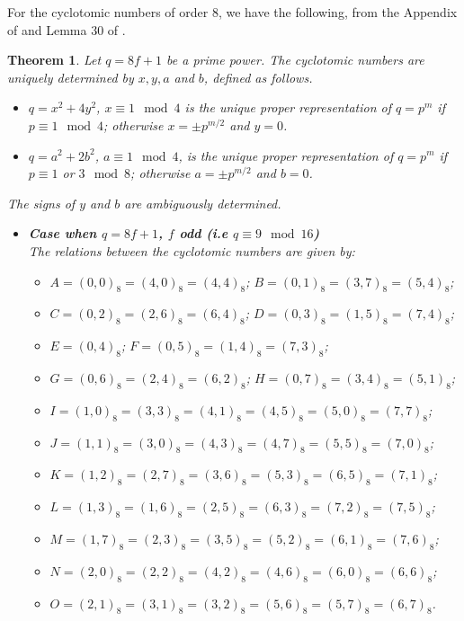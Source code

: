 \documentclass[12pt, a4paper]{article}
\newtheorem{theorem}{Theorem}[section]
\theoremstyle{definition}
\begin{document}
For the cyclotomic numbers of order $8$, we have the following, from the Appendix of \cite{BraMei} and Lemma 30 of \cite{Sto}.

\begin{theorem}\label{thm:e=8cyclo}
Let $q=8f+1$ be a prime power.  The cyclotomic numbers are uniquely determined by $x,y,a$ and $b$, defined as follows.
\begin{itemize}
    \item $q=x^2+4y^2$, $x \equiv 1 \mod 4$ is the unique proper representation of $q=p^m$ if $p \equiv 1 \mod 4$; otherwise $x=\pm p^{m/2}$ and $y=0$.
    \item $q=a^2+2b^2$, $a \equiv 1 \mod 4$, is the unique proper representation of $q=p^m$ if $p \equiv 1$ or $3 \mod 8$; otherwise $a= \pm p^{m/2}$ and $b=0$. 
\end{itemize}
The signs of $y$ and $b$ are ambiguously determined.

\begin{itemize}
\item[]{\bf Case when $q=8f+1$, $f$ odd (i.e $q \equiv 9 \mod 16$)}\\
The relations between the cyclotomic numbers are given by:
\begin{itemize}
\item[]$A=(0,0)_8 =(4,0)_8 =(4,4)_8$; $B=(0,1)_8 =(3,7)_8 =(5,4)_8$;
\item[]$C=(0,2)_8 =(2,6)_8 =(6,4)_8$; $D=(0,3)_8 =(1,5)_8 =(7,4)_8$; 
\item[]$E=(0,4)_8$; $F=(0,5)_8 =(1,4)_8 =(7,3)_8$; 
\item[]$G=(0,6)_8 =(2,4)_8 =(6,2)_8$; $H=(0,7)_8 =(3,4)_8 =(5,1)_8$;
\item[]$I=(1,0)_8 =(3,3)_8 =(4,1)_8 =(4,5)_8 =(5,0)_8 =(7,7)_8$;
\item[]$J=(1,1)_8 =(3,0)_8 =(4,3)_8 =(4,7)_8 =(5,5)_8 =(7,0)_8$;
\item[]$K=(1,2)_8 =(2,7)_8 =(3,6)_8 =(5,3)_8 =(6,5)_8 =(7,1)_8$;
\item[]$L=(1,3)_8 =(1,6)_8 =(2,5)_8 =(6,3)_8 =(7,2)_8 =(7,5)_8$;
\item[]$M=(1,7)_8 =(2,3)_8 =(3,5)_8 =(5,2)_8 =(6,1)_8 =(7,6)_8$;
\item[]$N=(2,0)_8 =(2,2)_8 =(4,2)_8 =(4,6)_8 =(6,0)_8 =(6,6)_8$;
\item[]$O=(2,1)_8 =(3,1)_8 =(3,2)_8 =(5,6)_8 =(5,7)_8 =(6,7)_8$.
\end{itemize}


\end{itemize}
\end{theorem}
\end{document}
